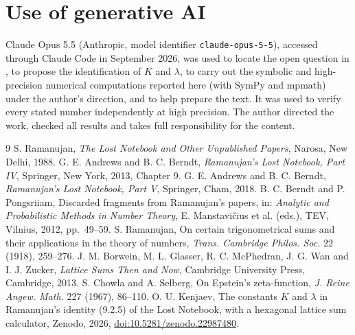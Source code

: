 \documentclass[11pt]{article}
\theoremstyle{remark}
\begin{document}
\section*{Use of generative AI}
Claude Opus 5.5 (Anthropic, model identifier \texttt{claude-opus-5-5}), accessed through Claude Code in September 2026, was used to
locate the open question in \cite{AB4}, to propose the identification of $K$ and $\lambda$, to carry out the symbolic and high-precision
numerical computations reported here (with SymPy and mpmath) under the author's direction, and to help prepare the text. It was used to
verify every stated number independently at high precision. The author directed the work, checked all results and takes full
responsibility for the content.

\begin{thebibliography}{9}
 S. Ramanujan, \emph{The Lost Notebook and Other Unpublished Papers}, Narosa, New Delhi, 1988.
 G. E. Andrews and B. C. Berndt, \emph{Ramanujan's Lost Notebook, Part IV}, Springer, New York, 2013, Chapter 9.
 G. E. Andrews and B. C. Berndt, \emph{Ramanujan's Lost Notebook, Part V}, Springer, Cham, 2018.
 B. C. Berndt and P. Pongsriiam, Discarded fragments from Ramanujan's papers, in: \emph{Analytic and Probabilistic
Methods in Number Theory}, E. Manstavi\v{c}ius et al. (eds.), TEV, Vilnius, 2012, pp.~49--59.
 S. Ramanujan, On certain trigonometrical sums and their applications in the theory of numbers, \emph{Trans.
Cambridge Philos. Soc.} 22 (1918), 259--276.
 J. M. Borwein, M. L. Glasser, R. C. McPhedran, J. G. Wan and I. J. Zucker, \emph{Lattice Sums Then and Now},
Cambridge University Press, Cambridge, 2013.
 S. Chowla and A. Selberg, On Epstein's zeta-function, \emph{J. Reine Angew. Math.} 227 (1967), 86--110.
 O. U. Kenjaev, The constants $K$ and $\lambda$ in Ramanujan's identity (9.2.5) of the Lost Notebook, with a hexagonal
lattice sum calculator, Zenodo, 2026, \href{https://doi.org/10.5281/zenodo.22987480}{doi:10.5281/zenodo.22987480}.
\end{thebibliography}
\end{document}
